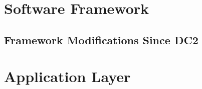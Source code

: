 \documentclass[preprint]{aastex}
\begin{document}




\section{Software Framework}

\subsection{Framework Modifications Since DC2}













\section{Application Layer}


























\end{document}
